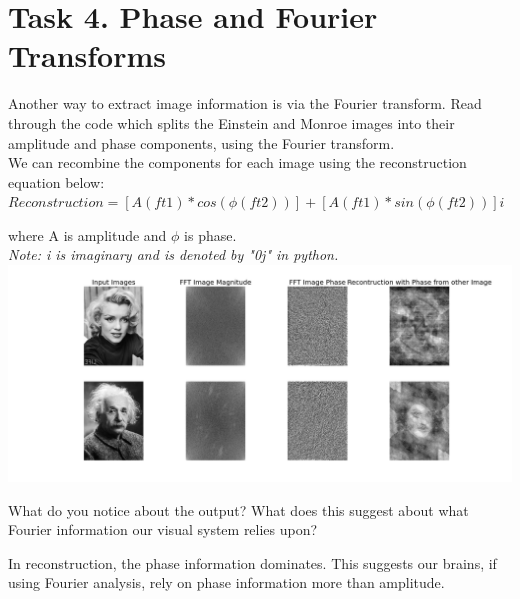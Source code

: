 \documentclass[12pt,english]{scrartcl}
\begin{document}
\section*{Task 4. Phase and Fourier Transforms}
\raggedright
Another way to extract image information is via the Fourier transform. Read through the code which splits the Einstein and Monroe images into their amplitude and phase components, using the Fourier transform.  \\
\bigskip
We can recombine the components for each image using the reconstruction equation below: \\
\centering
$Reconstruction = [A(ft1)*cos(\phi(ft2))] + [A(ft1)*sin(\phi(ft2))] i$ \\
\raggedright
where A is amplitude and $\phi$ is phase.\\
\bigskip
{\it Note: i is imaginary and is denoted by "0j" in python.} \\
\centering
 \includegraphics[scale=0.4]{task_4_1.png} 
\raggedright
What do you notice about the output? What does this suggest about what Fourier information our visual system relies upon?

\color{blue}
In reconstruction, the phase information dominates. This suggests our brains, if using Fourier analysis, rely on phase information more than amplitude.


 
\end{document}
